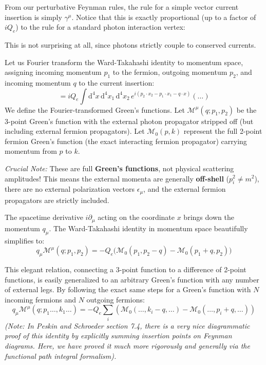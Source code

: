 From our perturbative Feynman rules, the rule for a simple vector current insertion is simply $\gamma^\mu$. Notice that this is exactly proportional (up to a factor of $iQ_e$) to the rule for a standard photon interaction vertex:


This is not surprising at all, since photons strictly couple to conserved currents.

Let us Fourier transform the Ward-Takahashi identity to momentum space, assigning incoming momentum $p_1$ to the fermion, outgoing momentum $p_2$, and incoming momentum $q$ to the current insertion:
\[
    = iQ_e \int \mathrm{d}^4x \, \mathrm{d}^4x_1 \, \mathrm{d}^4x_2 \, e^{i(p_2 \cdot x_2 - p_1 \cdot x_1 - q \cdot x)} (\dots)
\]
We define the Fourier-transformed Green's functions. Let $\mathcal{M}^\mu(q; p_1, p_2)$ be the 3-point Green's function with the external photon propagator stripped off (but including external fermion propagators). Let $\mathcal{M}_0(p, k)$ represent the full 2-point fermion Green's function (the exact interacting fermion propagator) carrying momentum from $p$ to $k$.


\textit{Crucial Note:} These are full \textbf{Green's functions}, not physical scattering amplitudes! This means the external momenta are generally \textbf{off-shell} ($p_i^2 \neq m^2$), there are no external polarization vectors $\epsilon_\mu$, and the external fermion propagators are strictly included.

The spacetime derivative $i\partial_\mu$ acting on the coordinate $x$ brings down the momentum $q_\mu$. The Ward-Takahashi identity in momentum space beautifully simplifies to:
\[
    q_\mu \mathcal{M}^\mu(q; p_1, p_2) = -Q_e \Big( \mathcal{M}_0(p_1, p_2 - q) - \mathcal{M}_0(p_1 + q, p_2) \Big)
\]

This elegant relation, connecting a 3-point function to a difference of 2-point functions, is easily generalized to an arbitrary Green's function with any number of external legs. By following the exact same steps for a Green's function with $N$ incoming fermions and $N$ outgoing fermions:
\[
    q_\mu \mathcal{M}^\mu(q; p_1 \dots, k_1 \dots) = -Q_e \sum_i \left( \mathcal{M}_0(\dots, k_i - q, \dots) - \mathcal{M}_0(\dots, p_i + q, \dots) \right)
\]
\textit{(Note: In Peskin and Schroeder section 7.4, there is a very nice diagrammatic proof of this identity by explicitly summing insertion points on Feynman diagrams. Here, we have proved it much more rigorously and generally via the functional path integral formalism).}


